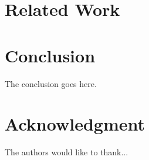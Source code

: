 \documentclass[conference]{IEEEtran}
\begin{document}
%



%
\section{Related Work}


\section{Conclusion}
The conclusion goes here.


\section*{Acknowledgment}
The authors would like to thank...
\end{document}
